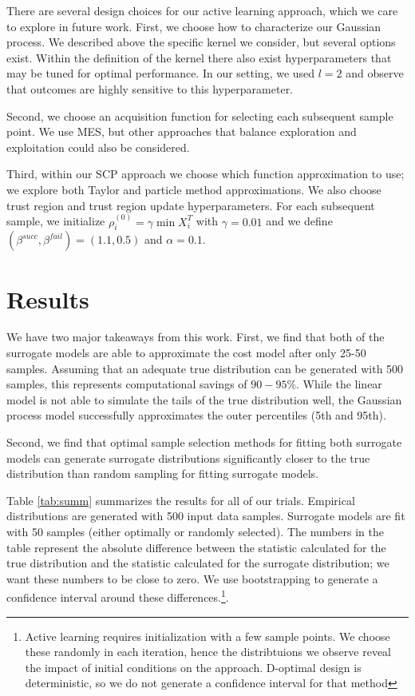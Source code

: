 \documentclass[10pt,twocolumn,letterpaper]{article}
\begin{document}
There are several design choices for our active learning approach, which we care to explore in future work. First, we choose how to characterize our Gaussian process. We described above the specific kernel we consider, but several options exist. Within the definition of the kernel there also exist hyperparameters that may be tuned for optimal performance. In our setting, we used $l=2$ and observe that outcomes are highly sensitive to this hyperparameter.

Second, we choose an acquisition function for selecting each subsequent sample point. We use MES, but other approaches that balance exploration and exploitation could also be considered. 

Third, within our SCP approach we choose which function approximation to use; we explore both Taylor and particle method approximations. We also choose trust region and trust region update hyperparameters. For each subsequent sample, we initialize $\rho^{(0)}_i = \gamma \min X_i^T$ with $\gamma=0.01$ and we define $(\beta^{succ}, \beta^{fail}) = (1.1, 0.5)$ and $\alpha=0.1$.
\section{Results}
\label{sec:results}
We have two major takeaways from this work. First, we find that both of the surrogate models are able to approximate the cost model after only 25-50 samples. Assuming that an adequate true distribution can be generated with 500 samples, this represents computational savings of $90-95\%$. While the linear model is not able to simulate the tails of the true distribution well, the Gaussian process model successfully approximates the outer percentiles (5th and 95th).

Second, we find that optimal sample selection methods for fitting both surrogate models can generate surrogate distributions significantly closer to the true distribution than random sampling for fitting surrogate models.

Table \ref{tab:summ} summarizes the results for all of our trials. Empirical distributions are generated with 500 input data samples. Surrogate models are fit with 50 samples (either optimally or randomly selected). The numbers in the table represent the absolute difference between the statistic calculated for the true distribution and the statistic calculated for the surrogate distribution; we want these numbers to be close to zero. We use bootstrapping to generate a confidence interval around these differences.\footnote{Active learning requires initialization with a few sample points. We choose these randomly in each iteration, hence the distribtuions we observe reveal the impact of initial conditions on the approach. D-optimal design is deterministic, so we do not generate a confidence interval for that method}.
\end{document}
